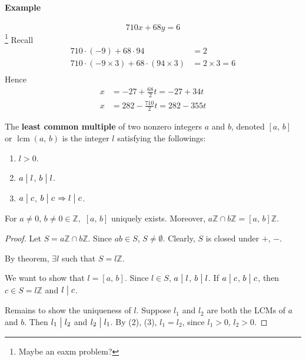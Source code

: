 \paragraph{Example}
\[
    710 x + 68 y = 6
\]\footnote{Maybe an eaxm problem?}
Recall
\begin{align*}
    710\cdot\left(-9\right)+68\cdot94&=2 \\
    710\cdot\left(-9\times 3\right)+68\cdot\left(94\times 3\right)&=2\times3=6 \\
\end{align*}
Hence
\begin{align*}
    x&=-27+\frac{68}{2}t=-27+34t \\
    x&=282-\frac{710}{2}t=282-355t
\end{align*}

\begin{definition}
    The \textbf{least common multiple} of two nonzero integers $a$ and $b$,
    denoted $\left[a,\,b\right]$ or $\mathop{\mathrm{lcm}}\left(a,\,b\right)$
    is the integer $l$ satisfying the followings:
    \begin{enumerate}
        \item $l>0$.
        \item $a\bigm| l$, $b\bigm| l$.
        \item $a\bigm| c$, $b\bigm| c$ $\Rightarrow l\bigm| c$.
    \end{enumerate}
\end{definition}

\begin{theorem}
    For $a\neq 0,\,b\neq 0 \in \mathbb{Z},$ $\left[a,\,b\right]$ uniquely exists.
    Moreover, $a\mathbb{Z} \cap b\mathbb{Z} = \left[a,\,b\right]\mathbb{Z}$.
\end{theorem}

\begin{proof}
    Let $S=a\mathbb{Z} \cap b\mathbb{Z}$.
    Since $ab \in S$, $S \neq \emptyset$. Clearly, $S$ is closed under $+$, $-$.

    By theorem, $\exists l$ such that $S = l\mathbb{Z}$.

    We want to show that $l=\left[a,\,b\right]$. Since $l\in S$, $a\bigm| l$,
    $b\bigm| l$. If $a\bigm| c$, $b\bigm| c$, then $c \in S = l\mathbb{Z}$ and $l\bigm| c$.

    Remains to show the uniqueness of $l$. Suppose $l_1$ and $l_2$ are both the
    LCMs of $a$ and $b$. Then $l_1 \bigm| l_2$ and $l_2 \bigm| l_1$.
    By (2), (3), $l_1=l_2$, since $l_1>0,\,l_2>0$.
\end{proof}


